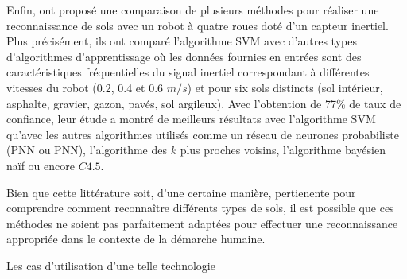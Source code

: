Enfin, \cite{Weiss2007} ont proposé une comparaison de plusieurs méthodes pour réaliser une reconnaissance de sols avec un robot à quatre roues doté d'un capteur inertiel. Plus précisément, ils ont comparé l'algorithme \acs{SVM} avec d'autres types d'algorithmes d'apprentissage où les données fournies en entrées sont des caractéristiques fréquentielles du signal inertiel correspondant à différentes vitesses du robot (0.2, 0.4 et 0.6 $m/s$) et pour six sols distincts (sol intérieur, asphalte, gravier, gazon, pavés, sol argileux). Avec l'obtention de 77\% de taux de confiance, leur étude a montré de meilleurs résultats avec l'algorithme \acs{SVM} qu'avec les autres algorithmes utilisés comme un réseau de neurones probabiliste (\acl{PNN} ou \acs{PNN}), l'algorithme des $k$ plus proches voisins, l'algorithme bayésien naïf ou encore $C4.5$.

Bien que cette littérature soit, d'une certaine manière, pertienente pour comprendre comment reconnaître différents types de sols, il est possible que ces méthodes ne soient pas parfaitement adaptées pour effectuer une reconnaissance appropriée dans le contexte de la démarche humaine.



Les cas d'utilisation d'une telle technologie





